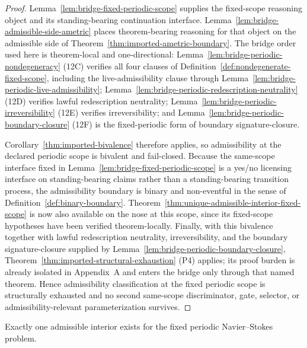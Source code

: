 \begin{proof}
Lemma~\ref{lem:bridge-fixed-periodic-scope} supplies the fixed-scope reasoning object and its standing-bearing continuation interface. Lemma~\ref{lem:bridge-admissible-side-ametric} places theorem-bearing reasoning for that object on the admissible side of Theorem~\ref{thm:imported-ametric-boundary}. The bridge order used here is theorem-local and one-directional: Lemma~\ref{lem:bridge-periodic-nondegeneracy} (12C) verifies all four clauses of Definition~\ref{def:nondegenerate-fixed-scope}, including the live-admissibility clause through Lemma~\ref{lem:bridge-periodic-live-admissibility}; Lemma~\ref{lem:bridge-periodic-redescription-neutrality} (12D) verifies lawful redescription neutrality; Lemma~\ref{lem:bridge-periodic-irreversibility} (12E) verifies irreversibility; and Lemma~\ref{lem:bridge-periodic-boundary-closure} (12F) is the fixed-periodic form of boundary signature-closure.

Corollary~\ref{thm:imported-bivalence} therefore applies, so admissibility at the declared periodic scope is bivalent and fail-closed. Because the same-scope interface fixed in Lemma~\ref{lem:bridge-fixed-periodic-scope} is a yes/no licensing interface on standing-bearing claims rather than a standing-bearing transition process, the admissibility boundary is binary and non-eventful in the sense of Definition~\ref{def:binary-boundary}. Theorem~\ref{thm:unique-admissible-interior-fixed-scope} is now also available on the nose at this scope, since its fixed-scope hypotheses have been verified theorem-locally. Finally, with this bivalence together with lawful redescription neutrality, irreversibility, and the boundary signature-closure supplied by Lemma~\ref{lem:bridge-periodic-boundary-closure}, Theorem~\ref{thm:imported-structural-exhaustion} (P4) applies; its proof burden is already isolated in Appendix~A and enters the bridge only through that named theorem. Hence admissibility classification at the fixed periodic scope is structurally exhausted and no second same-scope discriminator, gate, selector, or admissibility-relevant parameterization survives.
\end{proof}

\begin{manualcorollary}
\label{cor:periodic-unique-admissible-interior}
Exactly one admissible interior exists for the fixed periodic Navier--Stokes problem.
\end{manualcorollary}

